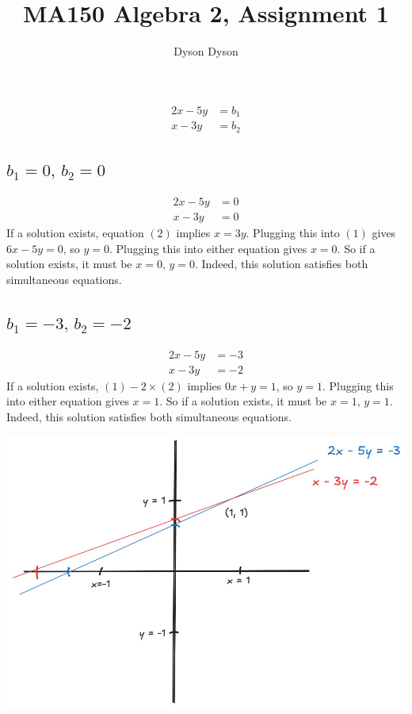 \documentclass[a4paper]{article}
\title{MA150 Algebra 2, Assignment 1}
\author{Dyson Dyson}
\date{}
\begin{document}
\maketitle

\setlength{\parindent}{0em}
\setlength{\parskip}{1em}


\begin{align*}
2x - 5y &= b_1\\
x - 3y &= b_2
\end{align*}

\subsection{$b_1 = 0,\, b_2 = 0$}

\begin{align*}
2x - 5y &= 0 \tag{1}\\
x - 3y &= 0 \tag{2}
\end{align*}
If a solution exists, equation $(2)$ implies $x = 3y$. Plugging this into $(1)$ gives $6x - 5y = 0$, so $y=0$. Plugging this into either equation gives $x=0$.
So if a solution exists, it must be $x=0,\, y=0$. Indeed, this solution satisfies both simultaneous equations.

\subsection{$b_1 = -3,\, b_2 = -2$}

\begin{align*}
2x - 5y &= -3 \tag{1}\\
x - 3y &= -2 \tag{2}
\end{align*}
If a solution exists, $(1) - 2 \times (2)$ implies $0x + y = 1$, so $y=1$. Plugging this into either equation gives $x=1$.
So if a solution exists, it must be $x=1,\, y=1$. Indeed, this solution satisfies both simultaneous equations.

\begin{center}\includegraphics[scale=0.35]{Q1b}\end{center}
\end{document}
